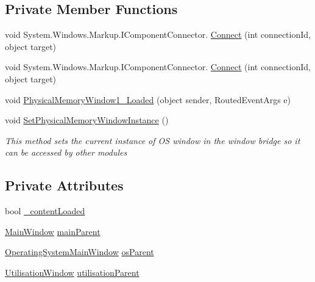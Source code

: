 \subsection*{Private Member Functions}
\begin{DoxyCompactItemize}
\item 
void System.\+Windows.\+Markup.\+I\+Component\+Connector. \hyperlink{class_c_p_u___o_s___simulator_1_1_physical_memory_window_a16f3c91431359797bb3dd01c1a7ba948}{Connect} (int connection\+Id, object target)
\item 
void System.\+Windows.\+Markup.\+I\+Component\+Connector. \hyperlink{class_c_p_u___o_s___simulator_1_1_physical_memory_window_a16f3c91431359797bb3dd01c1a7ba948}{Connect} (int connection\+Id, object target)
\item 
void \hyperlink{class_c_p_u___o_s___simulator_1_1_physical_memory_window_af07330a09e48dca65e2fc52838bf698a}{Physical\+Memory\+Window1\+\_\+\+Loaded} (object sender, Routed\+Event\+Args e)
\item 
void \hyperlink{class_c_p_u___o_s___simulator_1_1_physical_memory_window_ace7776bd461b2443e3c83b7fa64484da}{Set\+Physical\+Memory\+Window\+Instance} ()
\begin{DoxyCompactList}\small\item\em This method sets the current instance of O\+S window in the window bridge so it can be accessed by other modules \end{DoxyCompactList}\end{DoxyCompactItemize}
\subsection*{Private Attributes}
\begin{DoxyCompactItemize}
\item 
bool \hyperlink{class_c_p_u___o_s___simulator_1_1_physical_memory_window_af0d68d9589d9aa671b580a5b9c3f4851}{\+\_\+content\+Loaded}
\item 
\hyperlink{class_c_p_u___o_s___simulator_1_1_main_window}{Main\+Window} \hyperlink{class_c_p_u___o_s___simulator_1_1_physical_memory_window_a72efc6f331f6236abaaa103dd2430d6d}{main\+Parent}
\item 
\hyperlink{class_c_p_u___o_s___simulator_1_1_operating_system_main_window}{Operating\+System\+Main\+Window} \hyperlink{class_c_p_u___o_s___simulator_1_1_physical_memory_window_aa188424c9a32a838fc49c5411e3ebc99}{os\+Parent}
\item 
\hyperlink{class_c_p_u___o_s___simulator_1_1_utilisation_window}{Utilisation\+Window} \hyperlink{class_c_p_u___o_s___simulator_1_1_physical_memory_window_a314b7959882d19b7ae5dd2a27cd38307}{utilisation\+Parent}
\end{DoxyCompactItemize}


